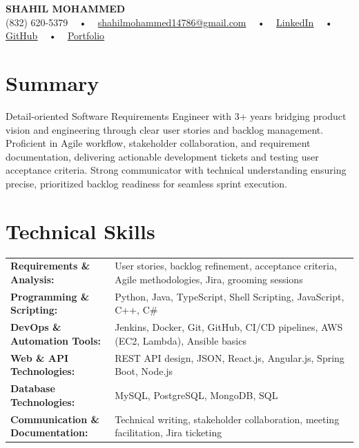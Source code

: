 \documentclass[letterpaper,11pt]{article}
\begin{document}
\begin{center}
    {\fontsize{14pt}{12pt}\selectfont \textbf{\MakeUppercase{Shahil Mohammed}}}\\ \vspace{2pt}
    \fontsize{10pt}{12pt}\selectfont (832) 620-5379 ~ • ~ \href{mailto:shahilmohammed14786@gmail.com}{shahilmohammed14786@gmail.com} ~ • ~  
    \href{https://www.linkedin.com/in/shahil-mohammed-9652931a1/}{\color{blue}\underline{LinkedIn}}  ~ • ~ 
    \href{https://github.com/freakbeast14}{\color{blue}\underline{GitHub}} ~ • ~ 
    \href{https://shahil-mohammed.netlify.app/}{\color{blue}\underline{Portfolio}}
    \vspace{-8pt}
\end{center}

\section{Summary}
\fontsize{9pt}{10pt}\selectfont
Detail-oriented Software Requirements Engineer with 3+ years bridging product vision and engineering through clear user stories and backlog management. Proficient in Agile workflow, stakeholder collaboration, and requirement documentation, delivering actionable development tickets and testing user acceptance criteria. Strong communicator with technical understanding ensuring precise, prioritized backlog readiness for seamless sprint execution.
 \vspace{-5pt}
 
\section{Technical Skills}
        \vspace{-14pt}
        \begin{table}[h]
            \fontsize{9pt}{10pt}\selectfont
            \begin{tabular}{p{0.3\linewidth} p{0.7\linewidth}}
                \textbf{Requirements \& Analysis:} & User stories, backlog refinement, acceptance criteria, Agile methodologies, Jira, grooming sessions \\
                \textbf{Programming \& Scripting:} & Python, Java, TypeScript, Shell Scripting, JavaScript, C++, C\# \\
                \textbf{DevOps \& Automation Tools:} & Jenkins, Docker, Git, GitHub, CI/CD pipelines, AWS (EC2, Lambda), Ansible basics \\
                \textbf{Web \& API Technologies:} & REST API design, JSON, React.js, Angular.js, Spring Boot, Node.js \\
                \textbf{Database Technologies:} & MySQL, PostgreSQL, MongoDB, SQL \\
                \textbf{Communication \& Documentation:} & Technical writing, stakeholder collaboration, meeting facilitation, Jira ticketing \\
            \end{tabular}
        \end{table}
 \vspace{-15pt}
 
\end{document}
